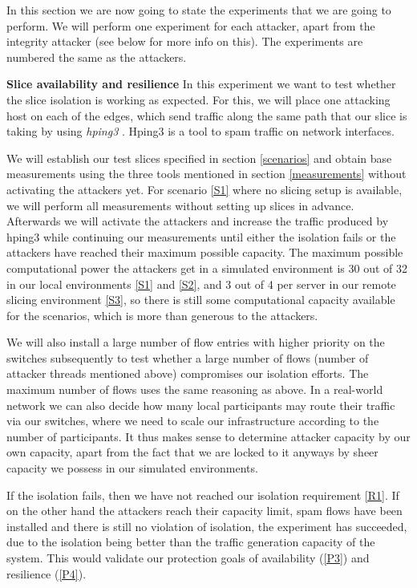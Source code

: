 In this section we are now going to state the experiments that we are going to perform. We will perform one experiment for each attacker, apart from the integrity attacker (see below for more info on this). The experiments are numbered the same as the attackers.

\begin{description}[style=multiline, labelwidth=0.7cm]
    \item[\namedlabel{E1}{E1}] \textbf{Slice availability and resilience} In this experiment we want to test whether the slice isolation is working as expected. For this, we will place one attacking host on each of the edges, which send traffic along the same path that our slice is taking by using \textit{hping3} \cite{hping3}. Hping3 is a tool to spam traffic on network interfaces.

    We will establish our test slices specified in section \ref{scenarios} and obtain base measurements using the three tools mentioned in section \ref{measurements} without activating the attackers yet. For scenario \ref{S1} where no slicing setup is available, we will perform all measurements without setting up slices in advance. Afterwards we will activate the attackers and increase the traffic produced by hping3 while continuing our measurements until either the isolation fails or the attackers have reached their maximum possible capacity. The maximum possible computational power the attackers get in a simulated environment is 30 out of 32 in our local environments \ref{S1} and \ref{S2}, and 3 out of 4 per server in our remote slicing environment \ref{S3}, so there is still some computational capacity available for the scenarios, which is more than generous to the attackers.

    We will also install a large number of flow entries with higher priority on the switches subsequently to test whether a large number of flows (number of attacker threads mentioned above) compromises our isolation efforts. The maximum number of flows uses the same reasoning as above. In a real-world network we can also decide how many local participants may route their traffic via our switches, where we need to scale our infrastructure according to the number of participants. It thus makes sense to determine attacker capacity by our own capacity, apart from the fact that we are locked to it anyways by sheer capacity we possess in our simulated environments.

    If the isolation fails, then we have not reached our isolation requirement \ref{R1}. If on the other hand the attackers reach their capacity limit, spam flows have been installed and there is still no violation of isolation, the experiment has succeeded, due to the isolation being better than the traffic generation capacity of the system. This would validate our protection goals of availability (\ref{P3}) and resilience (\ref{P4}).


\end{description}
